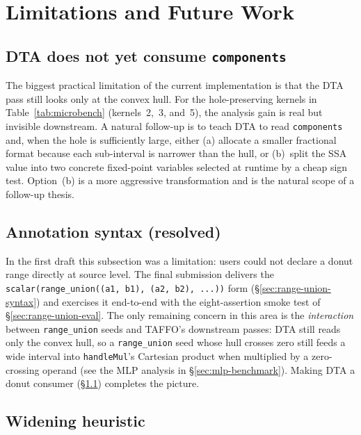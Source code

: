 \documentclass[11pt,a4paper]{article}
\theoremstyle{plain}
\begin{document}
\section{Limitations and Future Work}
\label{sec:limits}

\subsection{DTA does not yet consume \texttt{components}}
\label{sec:limit-dta}

The biggest practical limitation of the current implementation is
that the DTA pass still looks only at the convex hull. For the
hole-preserving kernels in Table~\ref{tab:microbench} (kernels~2,~3,
and~5), the analysis gain is real but invisible downstream. A natural
follow-up is to teach DTA to read \texttt{components} and, when the
hole is sufficiently large, either (a) allocate a smaller fractional
format because each sub-interval is narrower than the hull, or
(b)~split the SSA value into two concrete fixed-point variables
selected at runtime by a cheap sign test. Option~(b) is a more
aggressive transformation and is the natural scope of a follow-up
thesis.

\subsection{Annotation syntax (resolved)}

In the first draft this subsection was a limitation: users could not
declare a donut range directly at source level. The final submission
delivers the
\texttt{scalar(range\_union((a1, b1), (a2, b2), ...))} form
(\S\ref{sec:range-union-syntax}) and exercises it end-to-end with the
eight-assertion smoke test of \S\ref{sec:range-union-eval}. The only
remaining concern in this area is the \emph{interaction} between
\texttt{range\_union} seeds and TAFFO's downstream passes: DTA still
reads only the convex hull, so a \texttt{range\_union} seed whose
hull crosses zero still feeds a wide interval into
\texttt{handleMul}'s Cartesian product when multiplied by a
zero-crossing operand (see the MLP analysis in
\S\ref{sec:mlp-benchmark}). Making DTA a donut consumer
(\S\ref{sec:limit-dta}) completes the picture.

\subsection{Widening heuristic}
\end{document}
